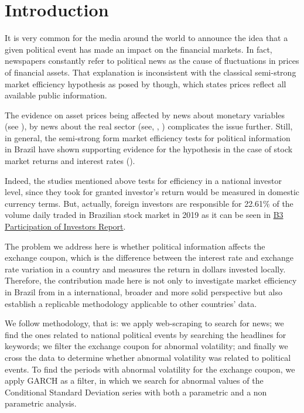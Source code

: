 \documentclass[cic,tc, english]{iiufrgs}
\begin{document}
\chapter{Introduction} \label{chapter_introduction}

    It is very common for the media around the world to announce the idea that a given political event has made an impact on the financial markets. In fact, newspapers constantly refer to political news as the cause of fluctuations in prices of financial assets. That explanation is inconsistent with the classical semi-strong market efficiency hypothesis as posed by \citet{fama1970} though, which states prices reflect all available public information.  
    
    The evidence on asset prices being affected by news about monetary variables (see \citet{cornell1983}), by news about the real sector (see, \citet{macqueenroley1993}, \citet{caporaleetal2015}) complicates the issue further. Still, in general, the semi-strong form market efficiency tests for political information in Brazil have shown supporting evidence for the hypothesis in the case of stock market returns and interest rates (\citet{marquessantos2016}).
    
    Indeed, the studies mentioned above tests for efficiency in a national investor level, since they took for granted investor's return would be measured in domestic currency terms.  But, actually, foreign investors are responsible for 22.61\% of the volume daily traded in Brazilian stock market in 2019 as it can be seen in  \href{http://www.b3.com.br/data/files/14/B4/D5/25/4B80B61070D79EA6AC094EA8/partdir_NOVOv2.xls}{B3 Participation of Investors Report}.
    
    The problem we address here is whether political information affects the exchange coupon, which is the difference between the interest rate and exchange rate variation in a country and measures the return in dollars invested locally. Therefore, the contribution made here is not only to investigate market efficiency in Brazil from in a international, broader and more solid perspective but also establish a replicable methodology applicable to other countries' data.
    
    We follow \citet{marquessantos2016} methodology, that is: we apply web-scraping to search for news; we find the ones related to national political events by searching the headlines for keywords; we filter the exchange coupon for abnormal volatility; and finally we cross the data to determine whether abnormal volatility was related to political events. To find the periods with abnormal volatility for the exchange coupon, we apply \citet{bollerslev1986} GARCH as a filter, in which we search for abnormal values of the Conditional Standard Deviation series with both a parametric and a non parametric analysis.
\end{document}

